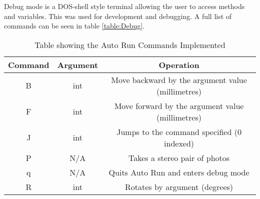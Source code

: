 Debug mode is a DOS-shell style terminal allowing the user to access methods and variables. This was used for development and debugging. A full list of commands can be seen in table \ref{table:Debug}. 

\begin{table}
\centering
\caption{Table showing the Auto Run Commands Implemented}
\label{table:AutoRun}
\begin{tabular}{|c|c|c|}\hline
Command & 	Argument 			& 	Operation \\\hline
B		&	int					&	Move backward by the argument value (millimetres) \\
F		&	int 				&	Move forward by the argument value (millimetres)\\
J		&	int					&	Jumps to the command specified (0 indexed)\\
P		&	N/A					&	Takes a stereo pair of photos\\
q		&	N/A					&	Quits Auto Run and enters debug mode\\
R		& 	int 			 	&	Rotates by argument (degrees)\\\hline
\end{tabular}
\end{table}

